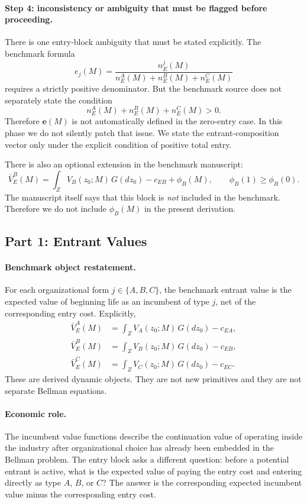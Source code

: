 \paragraph{Step 4: inconsistency or ambiguity that must be flagged before proceeding.}
There is one entry-block ambiguity that must be stated explicitly. The benchmark formula
\[
e_j(M)=\frac{n_E^j(M)}{n_E^A(M)+n_E^B(M)+n_E^C(M)}
\]
requires a strictly positive denominator. But the benchmark source does not separately state the condition
\[
n_E^A(M)+n_E^B(M)+n_E^C(M)>0.
\]
Therefore $\mathbf e(M)$ is not automatically defined in the zero-entry case. In this phase we do not silently patch that issue. We state the entrant-composition vector only under the explicit condition of positive total entry.

There is also an optional extension in the benchmark manuscript:
\[
\bar V_E^B(M)=\int_Z V_B(z_0;M)\,G(dz_0)-c_{EB}+\phi_B(M),
\qquad
\phi_B(1)\ge \phi_B(0).
\]
The manuscript itself says that this block is \emph{not} included in the benchmark. Therefore we do not include $\phi_B(M)$ in the present derivation.

\subsection{Part 1: Entrant Values}

\paragraph{Benchmark object restatement.}
For each organizational form $j\in\{A,B,C\}$, the benchmark entrant value is the expected value of beginning life as an incumbent of type $j$, net of the corresponding entry cost. Explicitly,
\begin{align*}
\bar V_E^A(M)&=\int_Z V_A(z_0;M)\,G(dz_0)-c_{EA},\\
\bar V_E^B(M)&=\int_Z V_B(z_0;M)\,G(dz_0)-c_{EB},\\
\bar V_E^C(M)&=\int_Z V_C(z_0;M)\,G(dz_0)-c_{EC}.
\end{align*}
These are derived dynamic objects. They are not new primitives and they are not separate Bellman equations.

\paragraph{Economic role.}
The incumbent value functions describe the continuation value of operating inside the industry after organizational choice has already been embedded in the Bellman problem. The entry block asks a different question: before a potential entrant is active, what is the expected value of paying the entry cost and entering directly as type $A$, $B$, or $C$? The answer is the corresponding expected incumbent value minus the corresponding entry cost.

